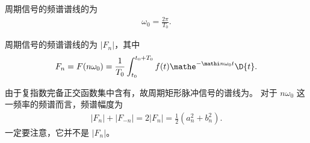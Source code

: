 \begin{property}[周期信号的频谱谱线的特点]
    周期信号的频谱谱线的为
    \begin{align*}
        \omega_0 = \frac{2\pi}{T_0}.
    \end{align*}
    
    周期信号的频谱谱线的为 $|F_n|$，其中
    \begin{align*}
        F_n = F(n\omega_0) = \frac{1}{T_0}\int_{t_0}^{t_0 + T_0}f(t)\mathe^{-\mathi n\omega_0 t}\D{t}.
    \end{align*}
\end{property}

\begin{note}
    由于复指数完备正交函数集中含有，故周期矩形脉冲信号的谱线为。
    对于 $n\omega_0$ 这一频率的频谱而言，频谱幅度为
    \begin{align*}
        |F_n| + |F_{-n}| = 2|F_n| = \frac{1}{2}\left(a_n^2 + b_n^2\right).
    \end{align*}
    一定要注意，它并不是 $|F_n|$。
\end{note}
